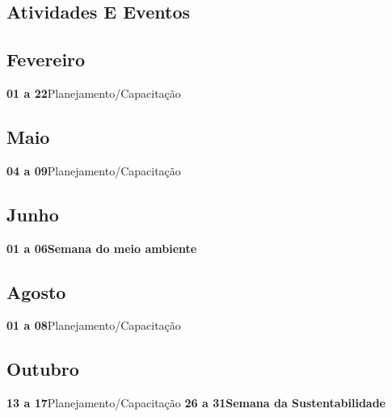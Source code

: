 \documentclass[thesis]{hmcposter}
\begin{document}
\begin{poster}
\section{\color{hmcorange}Atividades E Eventos}\subsection{Fevereiro}\textbf{01 a 22}\quad \quad Planejamento/Capacitação \newline\subsection{Maio}\textbf{04 a 09}\quad \quad Planejamento/Capacitação \newline\subsection{Junho}\textbf{01 a 06}\quad \quad \textbf{Semana do meio ambiente} \newline\subsection{Agosto}\textbf{01 a 08}\quad \quad Planejamento/Capacitação \newline\subsection{Outubro}\textbf{13 a 17}\quad \quad Planejamento/Capacitação \newline\textbf{26 a 31}\quad \quad \textbf{Semana da Sustentabilidade} \newline\end{poster}
\end{document}
